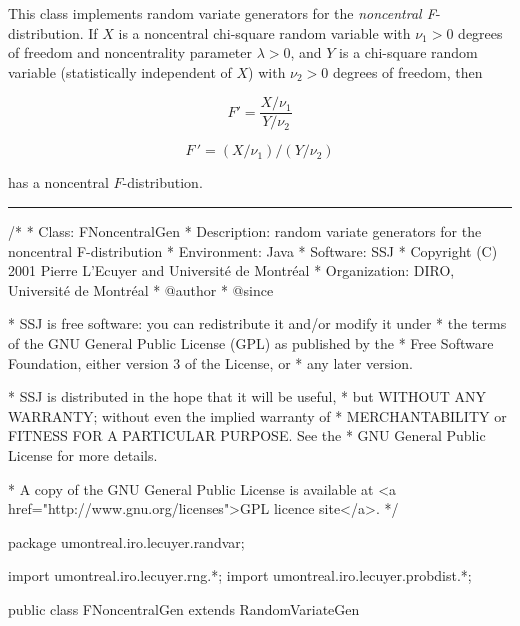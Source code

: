 
This class implements random variate generators for the 
\emph{noncentral F}-distribution.
If $X$ is a noncentral chi-square random variable with $\nu_1 > 0$ degrees of 
freedom and noncentrality parameter $\lambda > 0$, and $Y$ is a chi-square 
random variable (statistically independent of $X$) with $\nu_2>0$ degrees
 of freedom, then
\begin{latexonly}%
\[
             F' = \frac{X/\nu_1}{Y/\nu_2}
\]
\end{latexonly}%
\begin{htmlonly}%
\[
             F\,' = {(X/\nu_1)} / {(Y/\nu_2)}
\]
\end{htmlonly}%
has a noncentral $F$-distribution.


\bigskip\hrule

\begin{code}
\begin{hide}
/*
 * Class:        FNoncentralGen
 * Description:  random variate generators for the noncentral F-distribution
 * Environment:  Java
 * Software:     SSJ 
 * Copyright (C) 2001  Pierre L'Ecuyer and Université de Montréal
 * Organization: DIRO, Université de Montréal
 * @author       
 * @since

 * SSJ is free software: you can redistribute it and/or modify it under
 * the terms of the GNU General Public License (GPL) as published by the
 * Free Software Foundation, either version 3 of the License, or
 * any later version.

 * SSJ is distributed in the hope that it will be useful,
 * but WITHOUT ANY WARRANTY; without even the implied warranty of
 * MERCHANTABILITY or FITNESS FOR A PARTICULAR PURPOSE.  See the
 * GNU General Public License for more details.

 * A copy of the GNU General Public License is available at
   <a href="http://www.gnu.org/licenses">GPL licence site</a>.
 */
\end{hide}
package umontreal.iro.lecuyer.randvar;\begin{hide}
import umontreal.iro.lecuyer.rng.*;
import umontreal.iro.lecuyer.probdist.*;
\end{hide}

public class FNoncentralGen extends RandomVariateGen \begin{hide} {
   private ChiSquareNoncentralGen noncenchigen;
   private ChiSquareGen chigen;
   private double nu1;   // degrees of freedom of noncenchigen
   private int nu2;   // degrees of freedom of chigen

   public double nextDouble()  {
      double x = noncenchigen.nextDouble();
      double y = chigen.nextDouble();
      return (x * nu2) / (y * nu1);
   }
\end{hide}
\end{code}

